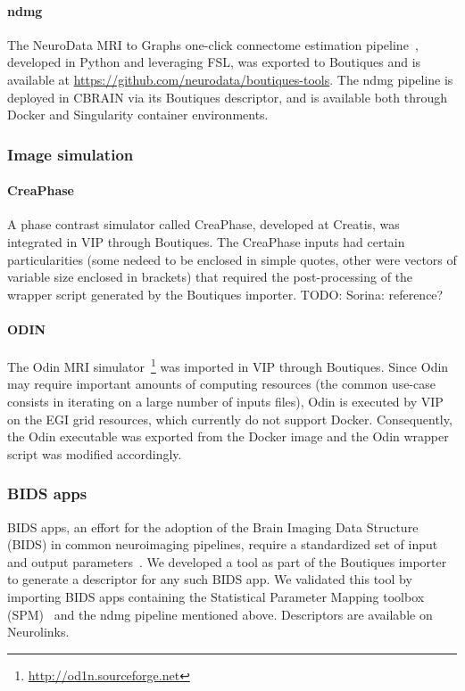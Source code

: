 \documentclass[a4paper,num-refs]{oup-contemporary}
\newcommand{\todo}[1]{\color{red}TODO: #1\color{black}}
\newcommand{\boutiques}{Boutiques\xspace}
\begin{document}
\paragraph{ndmg} The NeuroData MRI to Graphs one-click connectome estimation
pipeline~\cite{kiar2017comprehensive}, developed in Python and leveraging FSL, was
exported to \boutiques and is available at \url{https://github.com/neurodata/boutiques-tools}.
The ndmg pipeline is deployed in CBRAIN via its \boutiques descriptor, and is available
both through Docker and Singularity container environments.

\subsubsection{Image simulation}

\paragraph{CreaPhase}
A phase contrast simulator called CreaPhase, developed at Creatis, was
integrated in VIP through \boutiques. The CreaPhase inputs had
certain particularities (some nedeed to be enclosed in simple quotes,
other were vectors of variable size enclosed in brackets) that
required the post-processing of the wrapper script generated by the
Boutiques importer. \todo{Sorina: reference?}

\paragraph{ODIN} The Odin MRI simulator~\cite{jochimsen2004odin}\footnote{\url{http://od1n.sourceforge.net}} was imported 
in VIP through \boutiques. Since Odin may require important amounts of
computing resources (the common use-case consists in iterating on a
large number of inputs files), Odin is executed by VIP on the EGI grid
resources, which currently do not support Docker. Consequently, the
Odin executable was exported from the Docker image and the Odin
wrapper script was modified accordingly. 

\subsubsection{BIDS apps}

BIDS apps, an effort for the adoption of the Brain Imaging Data Structure (BIDS)
in common neuroimaging pipelines, require a standardized set of input
and output parameters~\cite{gorgolewski2017bids}. We developed a tool
as part of the \boutiques importer to generate a descriptor for any
such BIDS app. We validated this tool by importing BIDS apps
containing the Statistical Parameter Mapping toolbox
(SPM)~\cite{penny2011statistical} and the ndmg pipeline mentioned
above. Descriptors are available on Neurolinks.
\end{document}
